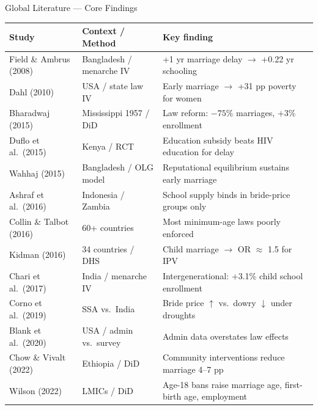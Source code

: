 \documentclass[aspectratio=169,10pt]{beamer}
\begin{document}
\begin{frame}{Global Literature --- Core Findings}
    \small
    \begin{tabular}{p{3.2cm} p{3cm} p{7cm}}
        \toprule
        \textbf{Study} & \textbf{Context / Method} & \textbf{Key finding} \\
        \midrule
        Field \& Ambrus (2008) & Bangladesh / menarche IV & +1 yr marriage delay $\rightarrow$ +0.22 yr schooling \\
        Dahl (2010) & USA / state law IV & Early marriage $\rightarrow$ +31 pp poverty for women \\
        Bharadwaj (2015) & Mississippi 1957 / DiD & Law reform: $-75\%$ marriages, $+3\%$ enrollment \\
        Duflo et al.\ (2015) & Kenya / RCT & Education subsidy beats HIV education for delay \\
        Wahhaj (2015) & Bangladesh / OLG model & Reputational equilibrium sustains early marriage \\
        Ashraf et al.\ (2016) & Indonesia / Zambia & School supply binds in bride-price groups only \\
        Collin \& Talbot (2016) & 60+ countries & Most minimum-age laws poorly enforced \\
        Kidman (2016) & 34 countries / DHS & Child marriage $\rightarrow$ OR $\approx$ 1.5 for IPV \\
        Chari et al.\ (2017) & India / menarche IV & Intergenerational: +3.1\% child school enrollment \\
        Corno et al.\ (2019) & SSA vs.\ India & Bride price $\uparrow$ vs.\ dowry $\downarrow$ under droughts \\
        Blank et al.\ (2020) & USA / admin vs.\ survey & Admin data overstates law effects \\
        Chow \& Vivalt (2022) & Ethiopia / DiD & Community interventions reduce marriage 4--7 pp \\
        Wilson (2022) & LMICs / DiD & Age-18 bans raise marriage age, first-birth age, employment \\
        \bottomrule
    \end{tabular}
\end{frame}
\end{document}
